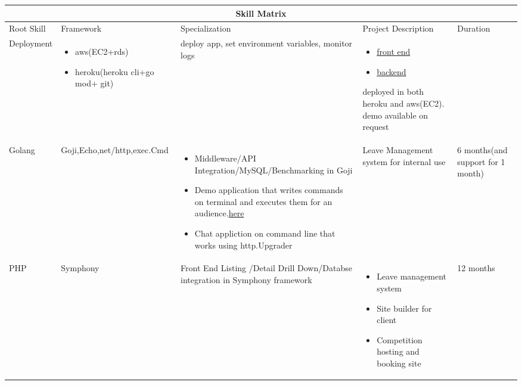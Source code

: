 \begin{center}
\begin{tabular}{|p{1.5cm}|p{2cm}|p{7cm}|p{7cm}|p{2cm}| }
 \hline
 \multicolumn{5}{|c|}{Skill Matrix} \\
 \hline
 Root Skill &Framework &Specialization &Project Description &Duration\\
 \hline
      Deployment 
    & \begin{itemize}
	\item aws(EC2+rds) 
	\item heroku(heroku
    cli+go mod+ git) 
    \end{itemize}
    & deploy app, set environment variables, monitor logs
    & \begin{itemize} 
	    \item \href{https://kuriancoding.github.io/graph.html}{front end}
	    \item \href{https://github.com/kurianCoding/demoback}{backend} 
    \end{itemize} 
    deployed in both heroku and aws(EC2).
    demo available on request
    & \\  
\hline
    Golang
    & Goji,Echo,net/http,exec.Cmd
    & \begin{itemize} 
	\item Middleware/API Integration/MySQL/Benchmarking in Goji   
	\item Demo application that writes commands on terminal and
	    executes them for an
	    audience.\href{https://github.com/kurianCoding/comma}{here}
	\item Chat appliction on command line that works using
	    http.Upgrader
	\end{itemize}
    & Leave Management system for internal use
    & 6 months(and support for 1 month)\\
\hline
    PHP
    & Symphony
	    
    & Front End Listing /Detail Drill Down/Databse
    integration in Symphony framework 
    &\begin{itemize} 
	    \item Leave management system 
	    \item Site builder for client 
	    \item Competition hosting and booking site
	\end{itemize}
    & 12  months \\
\hline
\end{tabular}
\end{center}

